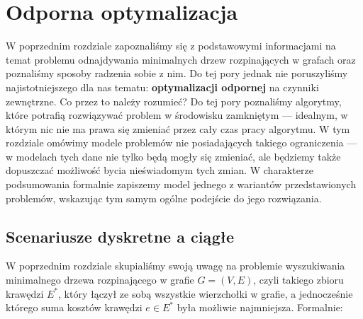 \chapter{Odporna optymalizacja}
\thispagestyle{chapterBeginStyle}

W poprzednim rozdziale zapoznaliśmy się z podstawowymi informacjami na temat problemu odnajdywania minimalnych drzew rozpinających w grafach oraz poznaliśmy sposoby radzenia sobie z nim. Do tej pory jednak nie poruszyliśmy najistotniejszego dla nas tematu: \textbf{optymalizacji odpornej} na czynniki zewnętrzne. Co przez to należy rozumieć? Do tej pory poznaliśmy algorytmy, które potrafią rozwiązywać problem w środowisku zamkniętym --- idealnym, w którym nic nie ma prawa się zmieniać przez cały czas pracy algorytmu. W tym rozdziale omówimy modele problemów nie posiadających takiego ograniczenia --- w modelach tych dane nie tylko będą mogły się zmieniać, ale będziemy także dopuszczać możliwość bycia nieświadomym tych zmian. W charakterze podsumowania formalnie zapiszemy model jednego z wariantów przedstawionych problemów, wskazując tym samym ogólne podejście do jego rozwiązania.

\section{Scenariusze dyskretne a ciągłe}

W poprzednim rozdziale skupialiśmy swoją uwagę na problemie wyszukiwania minimalnego drzewa rozpinającego w grafie $G = \left( V, E \right)$, czyli takiego zbioru krawędzi $E^{\ast}$, który łączył ze sobą wszystkie wierzchołki w grafie, a jednocześnie którego suma kosztów krawędzi $e \in E^{\ast}$ była możliwie najmniejsza. Formalnie:

